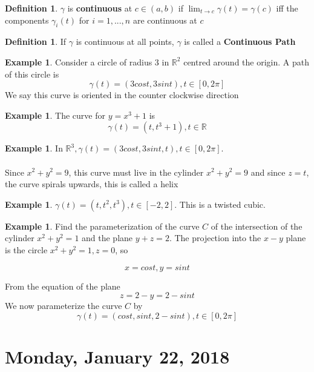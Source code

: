 \documentclass[12pt]{article}
\theoremstyle{plain}
\theoremstyle{definition}
\newtheorem{definition}[theorem]{Definition}
\newtheorem{example}[theorem]{Example}
\begin{document}
\begin{definition}
	$\gamma$ is \textbf{continuous} at $c\in (a,b)$ if $\lim_{t\to c} \gamma (t) = \gamma (c)$ iff the components $\gamma_i (t)$ for $i=1,...,n$ are continuous at $c$
\end{definition}

\begin{definition}
	If $\gamma$ is continuous at all points, $\gamma$ is called a \textbf{Continuous Path}
\end{definition}

\begin{example}
	Consider a circle of radius $3$ in $\mathbb{R}^2$ centred around the origin. A path of this circle is
	$$\gamma (t) = (3cost, 3sint), t \in [0,2\pi]$$
	We say this curve is oriented in the counter clockwise direction
\end{example}

\begin{example}
	The curve for $y=x^3 +1$ is
	$$\gamma (t) = (t, t^3 +1), t\in\mathbb{R}$$
\end{example}

\begin{example}
	In $\mathbb{R}^3, \gamma (t) = (3cost, 3sint, t) , t \in [0,2\pi]$.\\
	\\
	Since $x^2 + y^2 = 9$, this curve must live in the cylinder $x^2 + y^2 = 9$ and since $z=t$, the curve spirals upwards, this is called a helix
\end{example}

\begin{example}
	$\gamma (t)= (t, t^2, t^3), t\in [-2,2]$. This is a twisted cubic.
\end{example}

\begin{example}
	Find the parameterization of the curve $C$ of the intersection of the cylinder $x^2 + y^2 = 1$ and the plane $y+z = 2$. The projection into the $x-y$ plane is the circle $x^2 + y^2 = 1, z=0$, so

	$$x=cost, y=sint$$

	From the equation of the plane
	$$z = 2-y = 2-sint$$
	We now parameterize the curve $C$ by
	$$\gamma (t) = (cost, sint, 2-sint), t\in [0,2\pi]$$
\end{example}

\section{Monday, January 22, 2018}
\end{document}
